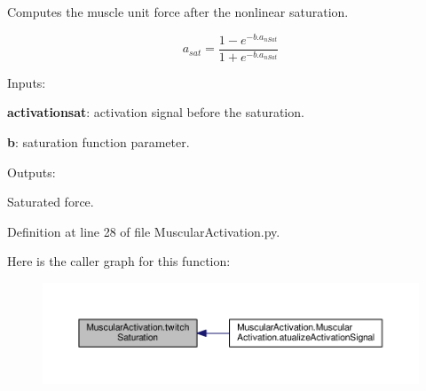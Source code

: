 Computes the muscle unit force after the nonlinear saturation. 

\begin{equation} a_{sat} = \frac{1-e^{-b.a_{nSat}}}{1+e^{-b.a_{nSat}}} \end{equation}


\begin{DoxyItemize}
\item Inputs\+:
\begin{DoxyItemize}
\item {\bfseries activationsat}\+: activation signal before the saturation.
\item {\bfseries b}\+: saturation function parameter.
\end{DoxyItemize}
\item Outputs\+:
\begin{DoxyItemize}
\item Saturated force. 
\end{DoxyItemize}
\end{DoxyItemize}

Definition at line 28 of file Muscular\+Activation.\+py.



Here is the caller graph for this function\+:
\nopagebreak
\begin{figure}[H]
\begin{center}
\leavevmode
\includegraphics[width=350pt]{namespace_muscular_activation_a4ba324691bfac6123a9fcd3be56a15ad_icgraph}
\end{center}
\end{figure}


